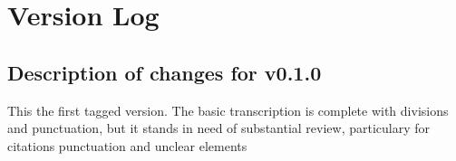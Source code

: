 \documentclass[twoside, openright]{article}
\begin{document}
        \fancyhead[LE]{}
        \chapter*{Version Log}
        
         
        \beginnumbering
         
        \bigskip
         \section*{Description of changes for v0.1.0} 
        \pstart
        This the first tagged version. The basic transcription is complete with divisions and punctuation, but it stands in need of substantial review, particulary for citations punctuation and unclear elements
        \pend
      
        \endnumbering
        
     
        
\end{document}
